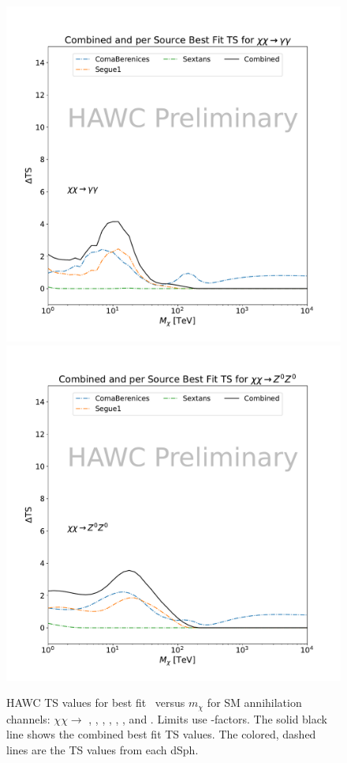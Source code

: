 \begin{figure}[h]
{    \includegraphics[scale=0.21]{figures/mtd_hawc_dm/results/CombinedTS_New_duck_gammagamma_.pdf}
    \includegraphics[scale=0.21]{figures/mtd_hawc_dm/results/CombinedTS_New_duck_zz_.pdf}
    }
    \caption{HAWC TS values for best fit \sv~versus $m_\chi$ for SM annihilation channels: $\chi\chi \rightarrow $ , \parpar{\nu_\mu}, \parpar{\nu_\tau}, , \parpar{\mu}, \parpar{\tau}, \pp{\gamma} and . Limits use \LS \J-factors. The solid black line shows the combined best fit TS values. The colored, dashed lines are the TS values from each dSph.}
\label{fig:mtd_TS_2of2}
\end{figure}

